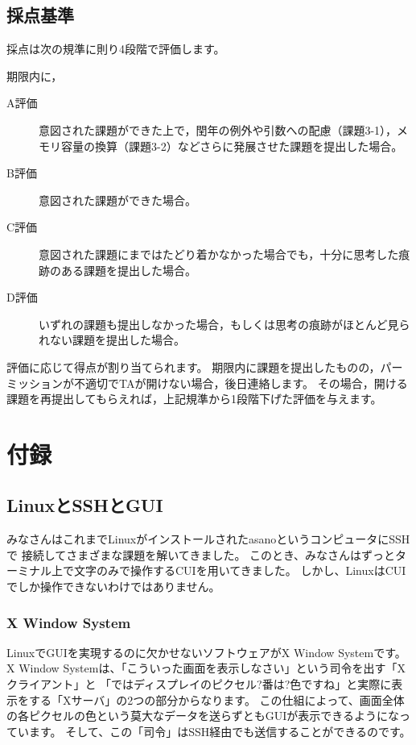 \documentclass[a4j]{ltjsreport}
\begin{document}
    \section{採点基準}
    採点は次の規準に則り4段階で評価します。

    期限内に，
    \begin{description}
    \item[A評価] 意図された課題ができた上で，閏年の例外や引数への配慮（課題3-1），メモリ容量の換算（課題3-2）などさらに発展させた課題を提出した場合。
    \item[B評価] 意図された課題ができた場合。
    \item[C評価] 意図された課題にまではたどり着かなかった場合でも，十分に思考した痕跡のある課題を提出した場合。
    \item[D評価] いずれの課題も提出しなかった場合，もしくは思考の痕跡がほとんど見られない課題を提出した場合。
    \end{description}
    評価に応じて得点が割り当てられます。
    期限内に課題を提出したものの，パーミッションが不適切でTAが開けない場合，後日連絡します。
    その場合，開ける課題を再提出してもらえれば，上記規準から1段階下げた評価を与えます。





    \chapter{付録}
    \section{LinuxとSSHとGUI}
    みなさんはこれまでLinuxがインストールされたasanoというコンピュータにSSHで
    接続してさまざまな課題を解いてきました。
    このとき、みなさんはずっとターミナル上で文字のみで操作するCUIを用いてきました。
    しかし、LinuxはCUIでしか操作できないわけではありません。

    \subsection{X Window System}
    LinuxでGUIを実現するのに欠かせないソフトウェアがX Window Systemです。
    X Window Systemは、「こういった画面を表示しなさい」という司令を出す「Xクライアント」と
    「ではディスプレイのピクセル?番は?色ですね」と実際に表示をする「Xサーバ」の2つの部分からなります。
    この仕組によって、画面全体の各ピクセルの色という莫大なデータを送らずともGUIが表示できるようになっています。
    そして、この「司令」はSSH経由でも送信することができるのです。
 
\end{document}
